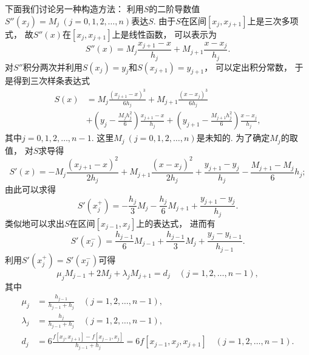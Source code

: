 下面我们讨论另一种构造方法：
利用\(S\)的二阶导数值\(S''(x_j) = M_j\ (j=0,1,2,\dotsc,n)\)表达\(S\).
由于\(S\)在区间\([x_j,x_{j+1}]\)上是三次多项式，
故\(S''(x)\)在\([x_j,x_{j+1}]\)上是线性函数，
可以表示为\begin{equation}
	S''(x) = M_j \frac{x_{j+1} - x}{h_j} + M_{j+1} \frac{x - x_j}{h_j}.
\end{equation}
对\(S''\)积分两次并利用\(S(x_j) = y_j\)和\(S(x_{j+1}) = y_{j+1}\)，
可以定出积分常数，
于是得到三次样条表达式\begin{equation}\label{equation:三次样条插值.用二阶导数值表示三次样条插值函数}
	\begin{aligned}
		S(x) &= M_j \frac{(x_{j+1} - x)^3}{6 h_j} + M_{j+1} \frac{(x - x_j)^3}{6 h_j} \\
		&+ \left( y_j - \frac{M_j h_j^2}{6} \right) \frac{x_{j+1} - x}{h_j}
		+ \left( y_{j+1} - \frac{M_{j+1} h_j^2}{6} \right) \frac{x - x_j}{h_j},
	\end{aligned}
\end{equation}
其中\(j=0,1,2,\dotsc,n-1\).
这里\(M_j\ (j=0,1,2,\dotsc,n)\)是未知的.
为了确定\(M_j\)的取值，
对\(S\)求导得\begin{equation}
	S'(x) = -M_j \frac{(x_{j+1} - x)^2}{2 h_j}
	+ M_{j+1} \frac{(x - x_j)^2}{2 h_j}
	+ \frac{y_{j+1} - y_j}{h_j}
	- \frac{M_{j+1} - M_j}{6} h_j;
\end{equation}
由此可以求得\begin{equation*}
	S'(x_j^+)
	= -\frac{h_j}{3} M_j
	- \frac{h_j}{6} M_{j+1}
	+ \frac{y_{j+1} - y_j}{h_j}.
\end{equation*}
类似地可以求出\(S\)在区间\([x_{j-1},x_j]\)上的表达式，
进而有\begin{equation*}
	S'(x_j^-)
	= \frac{h_{j-1}}{6} M_{j-1}
	+ \frac{h_{j-1}}{3} M_j
	+ \frac{y_j - y_{i-1}}{h_{j-1}}.
\end{equation*}
利用\(S'(x_j^+) = S'(x_j^-)\)可得\begin{equation}\label{equation:三次样条插值.一阶光滑的必要条件}
	\mu_j M_{j-1} + 2 M_j + \lambda_j M_{j+1}
	= d_j
	\quad(j=1,2,\dotsc,n-1),
\end{equation}
其中\begin{align}
	\mu_j
	&= \frac{h_{j-1}}{h_{j-1} + h_j}
	\quad(j=1,2,\dotsc,n-1), \\
	\lambda_j
	&= \frac{h_j}{h_{j-1} + h_j}
	\quad(j=1,2,\dotsc,n-1), \\
	d_j
	&= 6 \frac{f[x_j,x_{j+1}] - f[x_{j-1},x_j]}{h_{j-1} + h_j}
	= 6 f[x_{j-1},x_j,x_{j+1}]
	\quad(j=1,2,\dotsc,n-1).
\end{align}

